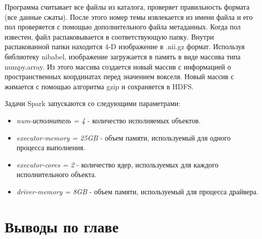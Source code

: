Программа считывает все файлы из каталога, проверяет правильность формата (все данные сжаты). После этого номер темы 
извлекается из имени файла и его пол проверяется с помощью дополнительного файла метаданных. Когда пол известен, файл 
распаковывается в соответствующую папку. Внутри распакованной папки находится 4-D изображение в .nii.gz формат. 
Используя библиотеку nibabel, изображение загружается в память в виде массива типа numpy.array. Из этого массива 
создается новый массив с информацией о пространственных координатах перед значением вокселя. Новый массив с
жимается с помощью алгоритма gzip и сохраняется в HDFS.

Задачи Spark запускаются со следующими параметрами:
\begin{itemize}
    \item \textit{num-исполнитель = 4} - количество исполняемых объектов.
    \item \textit{executor-memory = 25GB} - объем памяти, используемый для одного процесса выполнения.
    \item \textit{executor-cores = 2} - количество ядер, используемых для каждого исполнительного объекта.
    \item \textit{driver-memory = 8GB} - объем памяти, используемый для процесса драйвера.
\end{itemize}

\section{Выводы по главе}\label{sect3_3}
\clearpage
